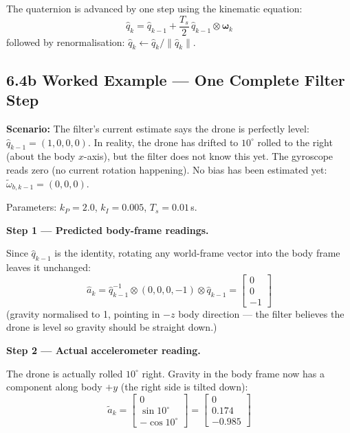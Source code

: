 \documentclass[12pt, a4paper]{article}
\begin{document}
The quaternion is advanced by one step using the kinematic equation:
\[
  \hat{q}_k
  = \hat{q}_{k-1} + \frac{T_s}{2}\,\hat{q}_{k-1} \otimes \boldsymbol{\omega}_k
\]
followed by renormalisation:
$\hat{q}_k \leftarrow \hat{q}_k / \|\hat{q}_k\|$.

\subsection*{6.4b \quad Worked Example --- One Complete Filter Step}

\begin{notebox}
  \textbf{Scenario:} The filter's current estimate says the drone is
  perfectly level: $\hat{q}_{k-1} = (1,0,0,0)$.
  In reality, the drone has drifted to $10^\circ$ rolled to the right
  (about the body $x$-axis), but the filter does not know this yet.
  The gyroscope reads zero (no current rotation happening).
  No bias has been estimated yet: $\tilde{\omega}_{b,k-1} = (0,0,0)$.

  Parameters: $k_P = 2.0$,\; $k_I = 0.005$,\; $T_s = 0.01$\,s.

  \medskip
  \textbf{Step 1 --- Predicted body-frame readings.}

  Since $\hat{q}_{k-1}$ is the identity, rotating any world-frame vector
  into the body frame leaves it unchanged:
  \[
    \hat{a}_k
    = \hat{q}_{k-1}^{-1}\otimes(0,0,0,-1)\otimes\hat{q}_{k-1}
    = \begin{bmatrix}0\\0\\-1\end{bmatrix}
  \]
  (gravity normalised to 1, pointing in $-z$ body direction --- the filter
  believes the drone is level so gravity should be straight down.)

  \textbf{Step 2 --- Actual accelerometer reading.}

  The drone is actually rolled $10^\circ$ right.
  Gravity in the body frame now has a component along body $+y$
  (the right side is tilted down):
  \[
    \tilde{a}_k
    = \begin{bmatrix} 0 \\ \sin 10^\circ \\ -\cos 10^\circ \end{bmatrix}
    = \begin{bmatrix} 0 \\ 0.174 \\ -0.985 \end{bmatrix}
  \]


\end{notebox}
\end{document}
